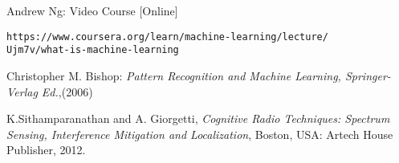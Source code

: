 \begin{thebibliography}{20}

 Andrew Ng: Video Course [Online] 
\begin{verbatim}
https://www.coursera.org/learn/machine-learning/lecture/
Ujm7v/what-is-machine-learning
\end{verbatim}

 Christopher M. Bishop:  \emph{Pattern Recognition and Machine Learning, Springer-Verlag Ed.},(2006) 

 K.Sithamparanathan and A. Giorgetti, \emph{Cognitive Radio Techniques: Spectrum Sensing, Interference Mitigation and Localization}, Boston, USA: Artech House Publisher, 2012.

\end{thebibliography}